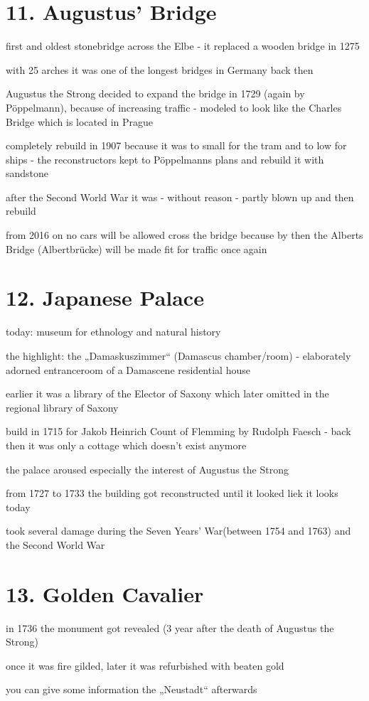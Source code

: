 \documentclass[a4paper,12pt]{report}
\begin{document}
\section{11. Augustus' Bridge}
\begin{itemize*}
\item first and oldest stonebridge across the Elbe - it replaced a wooden bridge in 1275
\item with 25 arches it was one of the longest bridges in Germany back then
\item Augustus the Strong decided to expand the bridge in 1729 (again by Pöppelmann), because of increasing traffic - modeled to look like the Charles Bridge which is located in Prague
\item completely rebuild in 1907 because it was to small for the tram and to low for ships - the reconstructors kept to Pöppelmanns plans and rebuild it with sandstone
\item after the Second World War it was - without reason - partly blown up and then rebuild
\item from 2016 on no cars will be allowed cross the bridge because by then the Alberts Bridge (Albertbrücke) will be made fit for traffic once again
\end{itemize*}

\section{12. Japanese Palace}
\begin{itemize*}
\item today: museum for ethnology and natural history
\item the highlight: the „Damaskuszimmer“ (Damascus chamber/room) - elaborately adorned entranceroom of a Damascene residential house
\item earlier it was a library of the Elector of Saxony which later omitted in the regional library of Saxony
\item build in 1715 for Jakob Heinrich Count of Flemming by Rudolph Faesch - back then it was only a cottage which doesn't exist anymore
\item the palace aroused especially the interest of Augustus the Strong
\item from 1727 to 1733 the building got reconstructed until it looked liek it looks today
\item took several damage during the Seven Years' War(between 1754 and 1763) and the Second World War
\end{itemize*}

\section{13. Golden Cavalier}
\begin{itemize*}
\item in 1736 the monument got revealed (3 year after the death of Augustus the Strong)
\item once it was fire gilded, later it was refurbished with beaten gold
\item you can give some information the „Neustadt“ afterwards
\end{itemize*}
\end{document}
